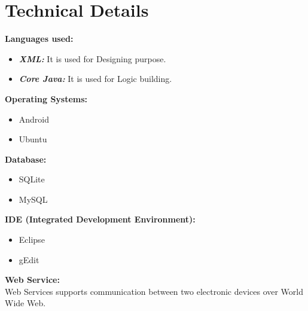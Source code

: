 \section{Technical Details}
\textbf{Languages used:}

\begin{itemize}
\item \textbf{\emph{XML:}} It is used for Designing purpose.
\item \textbf{\emph{Core Java:}} It is used for Logic building.
\end{itemize}
\textbf{Operating Systems:}
\begin{itemize}
\item Android
\item Ubuntu
\end{itemize}
\textbf{Database:}
\begin{itemize}
\item SQLite
\item MySQL
\end{itemize}
\textbf{IDE (Integrated Development Environment):}
\begin{itemize}
\item Eclipse
\item gEdit
\end{itemize}
\textbf{Web Service:}\\
Web Services supports communication between two electronic devices over World Wide Web.
